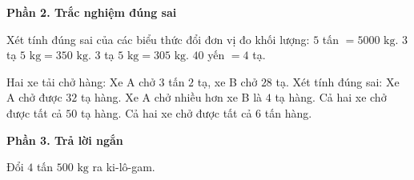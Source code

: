 \textbf{Phần 2. Trắc nghiệm đúng sai}

\begin{ex} %
Xét tính đúng sai của các biểu thức đổi đơn vị đo khối lượng:
\choiceTF
{\True $5$ tấn $= 5000\text{ kg}$.}
{$3$ tạ $5\text{ kg} = 350\text{ kg}$.}
{\True $3$ tạ $5\text{ kg} = 305\text{ kg}$.}
{\True $40$ yến $= 4$ tạ.}
\end{ex}

\begin{ex} %
Hai xe tải chở hàng: Xe A chở $3$ tấn $2$ tạ, xe B chở $28$ tạ. Xét tính đúng sai:
\choiceTF
{\True Xe A chở được $32$ tạ hàng.}
{\True Xe A chở nhiều hơn xe B là $4$ tạ hàng.}
{Cả hai xe chở được tất cả $50$ tạ hàng.}
{\True Cả hai xe chở được tất cả $6$ tấn hàng.}
\end{ex}

\textbf{Phần 3. Trả lời ngắn}

\begin{ex} %
Đổi $4$ tấn $500\text{ kg}$ ra ki-lô-gam.
\end{ex}

